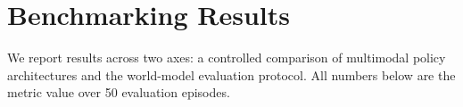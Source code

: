 \documentclass{article}
\begin{document}

\section{Benchmarking Results}
\label{sec:results}

We report results across two axes: a controlled comparison of multimodal policy architectures and the world-model evaluation protocol. All numbers below are the metric value over 50 evaluation episodes.




\end{document}

